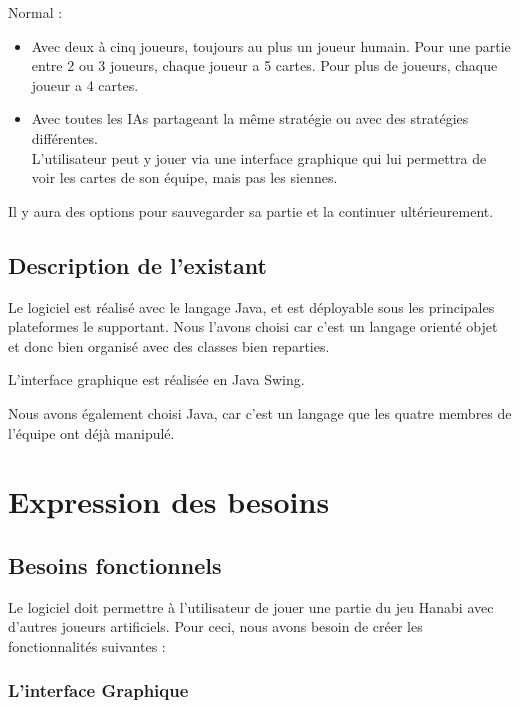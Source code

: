 \documentclass{article}
\begin{document}
 Normal :

\begin{itemize}

 \item Avec deux à cinq joueurs, toujours au plus un joueur humain. Pour une partie entre 2 ou 3 joueurs, chaque joueur a 5 cartes. Pour plus de joueurs, chaque joueur a 4 cartes.
 \item Avec toutes les IAs partageant la même stratégie ou avec des stratégies différentes.\\
 L’utilisateur peut y jouer via une interface graphique qui lui permettra de voir les cartes de son équipe, mais pas les siennes. 
 
\end{itemize}

Il y aura des options pour sauvegarder sa partie et la continuer ultérieurement. 

\subsection{Description de l'existant}

Le logiciel est réalisé avec le langage Java, et est déployable sous les principales plateformes le supportant. Nous l'avons choisi car c'est un langage orienté objet et donc bien organisé avec des classes bien reparties. 

L'interface graphique est réalisée en Java Swing.

Nous avons également choisi Java, car c'est un langage que les quatre membres de l'équipe ont déjà manipulé.

\section{Expression des besoins}

\subsection{Besoins fonctionnels}

Le logiciel doit permettre à l’utilisateur de jouer une partie du jeu Hanabi avec d’autres joueurs artificiels. Pour ceci, nous avons besoin de créer les fonctionnalités suivantes : 


\subsubsection{L’interface Graphique }
\end{document}
